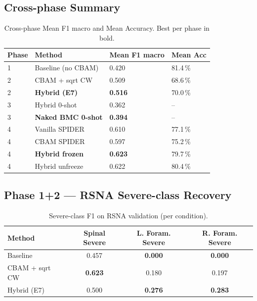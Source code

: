 \subsection{Cross-phase Summary}
\begin{table}[t]
\centering
\caption{Cross-phase Mean F1 macro and Mean Accuracy. Best per phase in bold.}
\label{tab:cross_phase}
\small
\begin{tabular}{@{}llll@{}}
\toprule
Phase & Method                & Mean F1 macro       & Mean Acc \\
\midrule
1     & Baseline (no CBAM)    & 0.420               & 81.4\,\% \\
2     & CBAM + sqrt CW        & 0.509               & 68.6\,\% \\
2     & \textbf{Hybrid (E7)}  & \textbf{0.516}      & 70.0\,\% \\
\midrule
3     & Hybrid 0-shot         & 0.362               & --       \\
3     & \textbf{Naked BMC 0-shot} & \textbf{0.394}  & --       \\
\midrule
4     & Vanilla SPIDER        & 0.610               & 77.1\,\% \\
4     & CBAM SPIDER           & 0.597               & 75.2\,\% \\
4     & \textbf{Hybrid frozen} & \textbf{0.623}     & 79.7\,\% \\
4     & Hybrid unfreeze       & 0.622               & 80.4\,\% \\
\bottomrule
\end{tabular}
\end{table}

\subsection{Phase 1+2 — RSNA Severe-class Recovery}
\begin{table}[t]
\centering
\caption{Severe-class F1 on RSNA validation (per condition).}
\label{tab:severe_f1}
\small
\begin{tabular}{@{}lccc@{}}
\toprule
Method            & Spinal Severe & L. Foram. Severe & R. Foram. Severe \\
\midrule
Baseline          & 0.457         & \textbf{0.000}   & \textbf{0.000} \\
CBAM + sqrt CW    & \textbf{0.623}& 0.180            & 0.197 \\
Hybrid (E7)       & 0.500         & \textbf{0.276}   & \textbf{0.283} \\
\bottomrule
\end{tabular}
\end{table}

